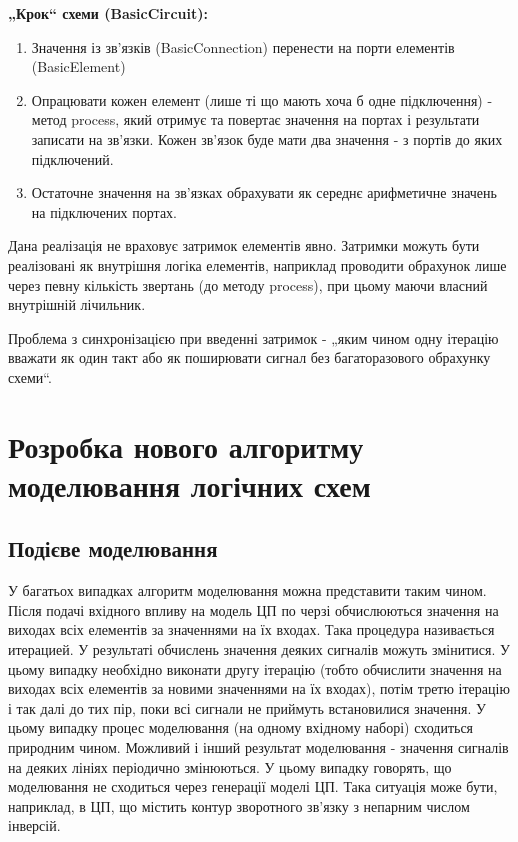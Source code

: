 \documentclass[12pt,a4paper]{article}
\begin{document}
\textbf{„Крок“ схеми (BasicCircuit):}
\begin{enumerate}
  \item Значення із зв’язків (BasicConnection) перенести на порти елементів (BasicElement)
  \item Опрацювати кожен елемент (лише ті що мають хоча б одне підключення) - метод process, який отримує та повертає значення на портах і результати записати на зв’язки. Кожен зв’язок буде мати два значення - з портів до яких підключений.
  \item Остаточне значення на зв’язках обрахувати як середнє арифметичне значень на підключених портах.
\end{enumerate}

Дана реалізація не враховує затримок елементів явно. Затримки можуть бути реалізовані як внутрішня логіка елементів, наприклад проводити обрахунок лише через певну кількість звертань (до методу process), при цьому маючи власний внутрішній лічильник.

Проблема з синхронізацією при введенні затримок - „яким чином одну ітерацію вважати як один такт або як поширювати сигнал без багаторазового обрахунку схеми“.

\clearpage

\section{Розробка нового алгоритму моделювання логічних схем}


\subsection{Подієве моделювання}

У багатьох випадках алгоритм моделювання можна представити таким чином. Після подачі вхідного впливу на модель ЦП по черзі обчислюються значення на виходах всіх елементів за значеннями на їх входах. Така процедура називається итерацией. У результаті обчислень значення деяких сигналів можуть змінитися. У цьому випадку необхідно виконати другу ітерацію (тобто обчислити значення на виходах всіх елементів за новими значеннями на їх входах), потім третю ітерацію і так далі до тих пір, поки всі сигнали не приймуть встановилися значення. У цьому випадку процес моделювання (на одному вхідному наборі) сходиться природним чином. Можливий і інший результат моделювання - значення сигналів на деяких лініях періодично змінюються. У цьому випадку говорять, що моделювання не сходиться через генерації моделі ЦП. Така ситуація може бути, наприклад, в ЦП, що містить контур зворотного зв'язку з непарним числом інверсій.
\end{document}
